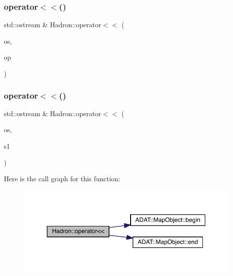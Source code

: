 \mbox{\label{namespaceHadron_a4875d0c001c7eed8b1cb2f65a5e9fb6f}} 
\subsubsection{\texorpdfstring{operator$<$$<$()}{operator<<()}\hspace{0.1cm}{\footnotesize\ttfamily [43/48]}}
{\footnotesize\ttfamily std\+::ostream \& Hadron\+::operator$<$$<$ (\begin{DoxyParamCaption}\item[{std\+::ostream \&}]{os,  }\item[{const \mbox{\hyperlink{structHadron_1_1KeySingleHadronQuarkDeriv__t}{Key\+Single\+Hadron\+Quark\+Deriv\+\_\+t}} \&}]{op }\end{DoxyParamCaption})}

\mbox{\label{namespaceHadron_a800dbac093bd07f370068965de5868b3}} 
\subsubsection{\texorpdfstring{operator$<$$<$()}{operator<<()}\hspace{0.1cm}{\footnotesize\ttfamily [44/48]}}
{\footnotesize\ttfamily std\+::ostream \& Hadron\+::operator$<$$<$ (\begin{DoxyParamCaption}\item[{std\+::ostream \&}]{os,  }\item[{const \mbox{\hyperlink{namespaceHadron_aa588220689caea8a6aad4d0296526e6b}{Map\+Single\+Hadron\+Quark\+Deriv\+\_\+t}} \&}]{s1 }\end{DoxyParamCaption})}

Here is the call graph for this function\+:
\nopagebreak
\begin{figure}[H]
\begin{center}
\leavevmode
\includegraphics[width=344pt]{d1/daf/namespaceHadron_a800dbac093bd07f370068965de5868b3_cgraph}
\end{center}
\end{figure}
\mbox{\label{namespaceHadron_a7b979b64d9a0ab8025031a090f9494c0}} 
